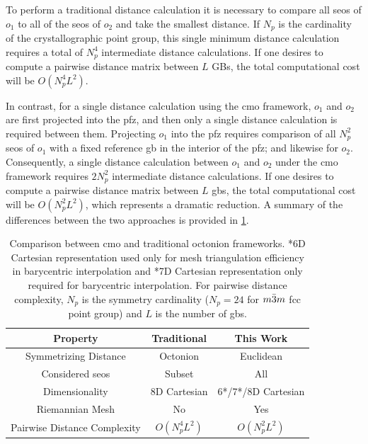 \documentclass[preprint,12pt]{elsarticle}
\begin{document}
To perform a traditional distance calculation it is necessary to compare all \glspl{seo} of $o_1$ to all of the \glspl{seo} of $o_2$ and take the smallest distance. If $N_p$ is the cardinality of the crystallographic point group, this single minimum distance calculation requires a total of $N_p^4$ intermediate distance calculations. If one desires to compute a pairwise distance matrix between $L$ GBs, the total computational cost will be $O(N_p^4L^2)$.

In contrast, for a single distance calculation using the \gls{cmo} framework, $o_1$ and $o_2$ are first projected into the \gls{pfz}, and then only a single distance calculation is required between them. Projecting $o_1$ into the \gls{pfz} requires comparison of all $N_p^2$ \glspl{seo} of $o_1$ with a fixed reference \gls{gb} in the interior of the \gls{pfz}; and likewise for $o_2$. Consequently, a single distance calculation between $o_1$ and $o_2$ under the \gls{cmo} framework requires $2N_p^2$ intermediate distance calculations. If one desires to compute a pairwise distance matrix between $L$ \glspl{gb}, the total computational cost will be $O(N_p^2L^2)$, which represents a dramatic reduction. A summary of the differences between the two approaches is provided in \cref{tab:closed-mesh-comparison}.

\begin{table}
\caption{Comparison between \acrlong{cmo} and traditional octonion frameworks. *6D Cartesian representation used only for mesh triangulation efficiency in barycentric interpolation and *7D Cartesian representation only required for barycentric interpolation. For pairwise distance complexity, $N_p$ is the symmetry cardinality ($N_p=24$ for $m\Bar{3}m$ \gls{fcc} point group) and $L$ is the number of \glspl{gb}.}
\centering
\begin{tabular}{ccc}
\toprule
Property & Traditional & This Work \\
\midrule
Symmetrizing Distance & Octonion & Euclidean \\
Considered \glspl{seo} & Subset & All \\
Dimensionality & 8D Cartesian & 6*/7*/8D Cartesian \\
Riemannian Mesh & No & Yes \\
Pairwise Distance Complexity & $O(N_p^4L^2)$ & $O(N_p^2L^2)$ \\
\bottomrule
\end{tabular}
\label{tab:closed-mesh-comparison}
\end{table}
\end{document}
